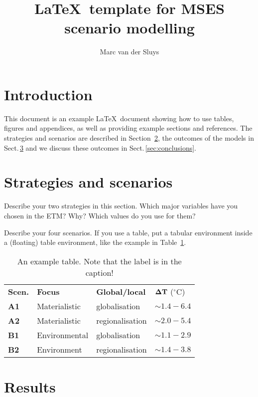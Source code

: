 \documentclass[11pt]{article}
\title{\LaTeX\ template for MSES scenario modelling}
\author{Marc van der Sluys}
\begin{document}
\maketitle

\tableofcontents


\section{Introduction}
\label{sec:intro}

This document is an example \LaTeX\ document showing how to use tables, figures and appendices, as well as
providing example sections and references.  The strategies and scenarios are described in
Section~\ref{sec:scenarios}, the outcomes of the models in Sect.\,\ref{sec:results} and we discuss these
outcomes in Sect.\,\ref{sec:conclusions}.


\section{Strategies and scenarios}
\label{sec:scenarios}

Describe your two strategies in this section.  Which major variables have you chosen in the
ETM?  Why?  Which values do you use for them?

Describe your four scenarios.  If you use a table, put a tabular environment inside a (floating) table
environment, like the example in Table~\ref{tab:example}.

\begin{table}
  \centering
  \begin{tabular}{llll}
    \textbf{Scen.} & \textbf{Focus} & \textbf{Global/local} & $\bf \Delta T$ ($^\circ$C) \\
    \textbf{A1}    &  Materialistic & globalisation         & $\sim 1.4 - 6.4$ \\
    \textbf{A2}    &  Materialistic & regionalisation       & $\sim 2.0 - 5.4$ \\
    \textbf{B1}    &  Environmental & globalisation         & $\sim 1.1 - 2.9$ \\
    \textbf{B2}    &  Environment   & regionalisation       & $\sim 1.4 - 3.8$ \\
  \end{tabular}
  \caption{An example table.  Note that the label is in the caption!
    \label{tab:example}
  }
\end{table}


\section{Results}
\label{sec:results}
\end{document}
